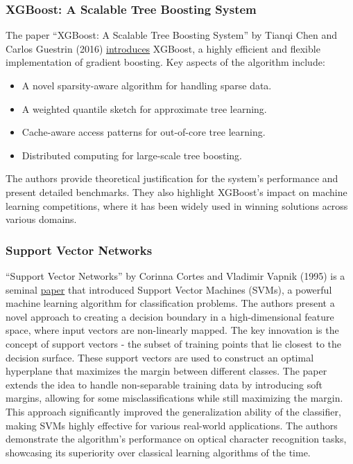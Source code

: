 \documentclass{article}
\begin{document}
\subsubsection*{XGBoost: A Scalable Tree Boosting System}

The paper ``XGBoost: A Scalable Tree Boosting System'' by Tianqi Chen and Carlos Guestrin (2016) \href{https://arxiv.org/abs/1603.02754}{introduces} XGBoost, a highly efficient and flexible implementation of gradient boosting.\cite{Chen2016} Key aspects of the algorithm include:
\begin{itemize}
    \item A novel sparsity-aware algorithm for handling sparse data.
    \item A weighted quantile sketch for approximate tree learning.
    \item Cache-aware access patterns for out-of-core tree learning.
    \item Distributed computing for large-scale tree boosting.
\end{itemize}

The authors provide theoretical justification for the system's performance and present detailed benchmarks. They also highlight XGBoost's impact on machine learning competitions, where it has been widely used in winning solutions across various domains.

\subsubsection*{Support Vector Networks}

``Support Vector Networks'' by Corinna Cortes and Vladimir Vapnik (1995) is a seminal \href{https://link.springer.com/article/10.1007/BF00994018}{paper} that introduced Support Vector Machines (SVMs), a powerful machine learning algorithm for classification problems.\cite{Cortes1995} The authors present a novel approach to creating a decision boundary in a high-dimensional feature space, where input vectors are non-linearly mapped. The key innovation is the concept of support vectors - the subset of training points that lie closest to the decision surface. These support vectors are used to construct an optimal hyperplane that maximizes the margin between different classes. The paper extends the idea to handle non-separable training data by introducing soft margins, allowing for some misclassifications while still maximizing the margin. This approach significantly improved the generalization ability of the classifier, making SVMs highly effective for various real-world applications. The authors demonstrate the algorithm's performance on optical character recognition tasks, showcasing its superiority over classical learning algorithms of the time.
\end{document}
